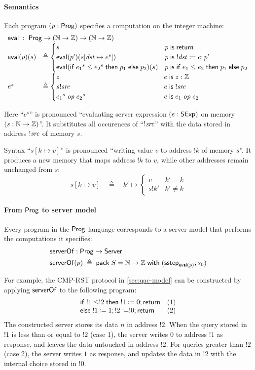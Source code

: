 \paragraph{Semantics}
Each program $(p:\mathsf{Prog})$ specifies a computation on the integer machine:
\[\begin{array}{ll}
\multicolumn{2}{l}{\Eval\;:\;\Prog\to(\Nat\to\Int)\to(\Nat\to\Int)}\\
\Eval(p)(s)&\triangleq
\begin{cases}
  s&p\Is\Return\\
  \Eval(p')(\update{s}{\dst}{e^s})&p\Is !\dst\coloneqq e;p'\\
  \Eval(\If {e_1}^s\le{e_2}^s\Then p_1\Else p_2)(s)&p\Is\If e_1\le e_2\Then p_1\Else p_2
\end{cases}\\
e^s&\triangleq
\begin{cases}
  z\hphantom{\Exec(\If {e_1}^s\le{e_2}^s\Then p_1\Else p_2,)}&e\Is z:\Int\\
  s!\src&e\Is !\src\\
  {e_1}^s\oop{e_2}^s&e\Is e_1\oop e_2
\end{cases}
\end{array}\]

Here ``$e^s$'' is pronounced ``evaluating server expression $(e:\mathsf{SExp})$ on
memory $(s:\mathbb N\to\mathbb Z)$''.  It substitutes all occurences of ``$!\mathit{src}$'' with
the data stored in address $!\mathit{src}$ of memory $s$.

Syntax ``$s[k\mapsto v]$'' is pronounced ``writing value $v$ to address $!k$ of
memory $s$''.  It produces a new memory that maps address $!k$ to $v$, while
other addresses remain unchanged from $s$:
\[s[k\mapsto v]\quad\triangleq\quad k'\mapsto\begin{cases}v&k'=k\\
s!k'&k'\neq k\end{cases}\]

\paragraph{From $\mathsf{Prog}$ to server model}
Every program in the $\mathsf{Prog}$ language corresponds to a server model that
performs the computations it specifies:
\begin{align*}
  &\mathsf{serverOf}:\mathsf{Prog}\to\mathsf{Server}\\
  &\mathsf{serverOf}(p)\;\triangleq\;\mathsf{pack}\;S=\mathbb N\to\mathbb Z\;\mathsf{with}\;(\mathsf{sstep}_{\mathsf{eval}(p)},s_0)
\end{align*}

For example, the CMP-RST protocol in \autoref{sec:qac-model} can be constructed
by applying $\mathsf{serverOf}$ to the following program:
\[\begin{array}{ll}
\mathsf{if}\; !1\le!2\;\mathsf{then}\; !1\coloneqq0;\mathsf{return}&(1)\\
\mathsf{else}\;!1\coloneqq1;!2\coloneqq!0;\mathsf{return}&(2)
\end{array}\]
The constructed server stores its data $n$ in address $!2$.  When the query
stored in $!1$ is less than or equal to $!2$ (case 1), the server writes $0$ to
address $!1$ as response, and leaves the data untouched in address $!2$.  For
queries greater than $!2$ (case 2), the server writes $1$ as response, and
updates the data in $!2$ with the internal choice stored in $!0$.

